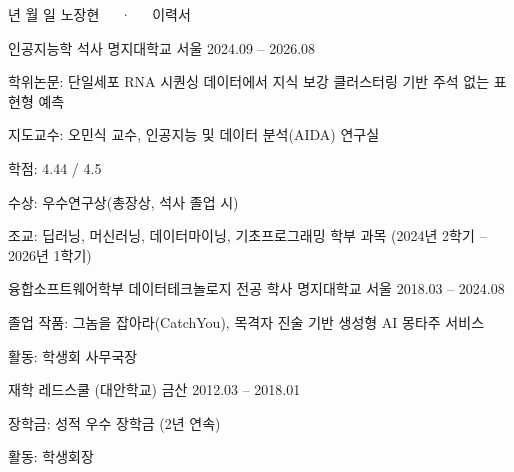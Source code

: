 \documentclass[11pt, a4paper]{awesome-cv}
\let\origcvsection\cvsection
\renewcommand{\cvsection}[1]{\needspace{7\baselineskip}\origcvsection{#1}}
\begin{document}
\makecvheader\vspace{4mm}

\makecvfooter
  {\the\year 년 \the\month 월 \the\day 일}
  {노장현~~~·~~~이력서}
  {\thepage}






\begin{cventries}
\cventry
    {인공지능학 석사}
    {명지대학교}
    {서울}
    {2024.09 -- 2026.08}
    {
      \begin{cvitems}
        \item {학위논문: 단일세포 RNA 시퀀싱 데이터에서 지식 보강 클러스터링 기반 주석 없는 표현형 예측}
        \item {지도교수: 오민식 교수, 인공지능 및 데이터 분석(AIDA) 연구실}
        \item {학점: 4.44 / 4.5}
        \item {수상: 우수연구상(총장상, 석사 졸업 시)}
        \item {조교: 딥러닝, 머신러닝, 데이터마이닝, 기초프로그래밍 학부 과목 (2024년 2학기 -- 2026년 1학기)}
      \end{cvitems}
    }
\vspace{-1mm}
\cventry
    {융합소프트웨어학부 데이터테크놀로지 전공 학사}
    {명지대학교}
    {서울}
    {2018.03 -- 2024.08}
    {
      \begin{cvitems}
        \item {졸업 작품: 그놈을 잡아라(CatchYou), 목격자 진술 기반 생성형 AI 몽타주 서비스}
        \item {활동: 학생회 사무국장}
      \end{cvitems}
    }
\vspace{-1mm}
\cventry
    {재학}
    {레드스쿨 (대안학교)}
    {금산}
    {2012.03 -- 2018.01}
    {
      \begin{cvitems}
        \item {장학금: 성적 우수 장학금 (2년 연속)}
        \item {활동: 학생회장}
      \end{cvitems}
    }
\end{cventries}
\end{document}
